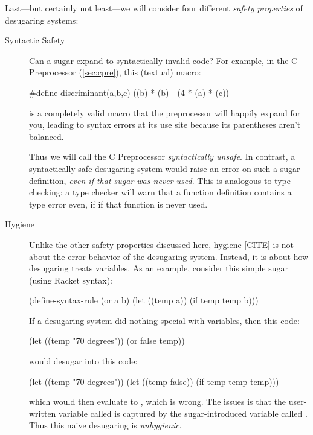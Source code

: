 Last---but certainly not least---we will consider four different
\emph{safety properties} of desugaring systems:
\begin{description}
  \item[Syntactic Safety] Can a sugar expand to syntactically invalid
    code? For example, in the C Preprocessor (\cref{sec:cpre}), this
    (textual) macro:
\begin{Codes}
#define discriminant(a,b,c) ((b) * (b) - (4 * (a) * (c))
\end{Codes}
    is a completely valid macro that the preprocessor will happily
    expand for you, leading to syntax errors at its use site because
    its parentheses aren't balanced.

    Thus we will call the C Preprocessor \emph{syntactically unsafe}.
    In contrast, a syntactically safe desugaring system would raise an
    error on such a sugar definition, \emph{even if that sugar was
      never used}. This is analogous to type checking: a type checker
    will warn that a function definition contains a type error even, if
    if that function is never used.
  \item[Hygiene] Unlike the other safety properties discussed here,
    hygiene [CITE] is not about the error behavior of the desugaring
    system.  Instead, it is about how desugaring treats variables. As
    an example, consider this simple  sugar (using Racket
    syntax):
\begin{Codes}
(define-syntax-rule
  (or a b)
  (let ((temp a)) (if temp temp b)))
\end{Codes}
    If a desugaring system did nothing special with variables, then
    this code:
\begin{Codes}
(let ((temp "70 degrees"))
  (or false temp))
\end{Codes}
    would desugar into this code:
\begin{Codes}
(let ((temp "70 degrees"))
  (let ((temp false)) (if temp temp temp)))
\end{Codes}%
    which would then evaluate to , which is wrong. The
    issues is that the user-written variable called  is
    captured by the sugar-introduced variable called .
    Thus this naive desugaring is \emph{unhygienic}.
    

\end{description}
